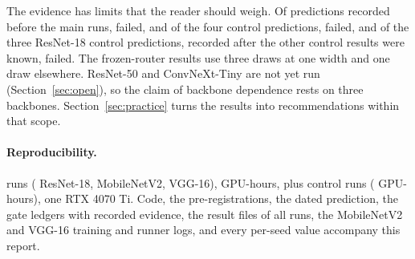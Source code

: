 \documentclass[10pt,a4paper]{article}
\begin{document}
The evidence has limits that the reader should weigh. Of 
predictions recorded before the main runs,  failed, and of the
four control predictions,  failed, and of the three ResNet-18
control predictions, recorded after the other control results were known,
 failed. The frozen-router results use
three draws at one width and one draw elsewhere. ResNet-50 and ConvNeXt-Tiny are not yet run
(Section~\ref{sec:open}), so the claim
of backbone dependence rests on three backbones. Section~\ref{sec:practice}
turns the results into recommendations within that scope.

\paragraph{Reproducibility.}  runs ( ResNet-18,
 MobileNetV2,  VGG-16),  GPU-hours, plus
 control runs ( GPU-hours), one RTX 4070 Ti. Code, the pre-registrations, the dated prediction, the gate
ledgers with recorded evidence, the result files of all  runs,
the MobileNetV2 and VGG-16 training and runner logs, and every per-seed
value accompany this report.
\end{document}
